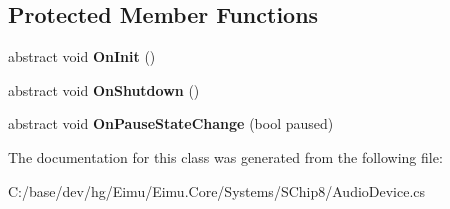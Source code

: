 \subsection*{Protected Member Functions}
\begin{DoxyCompactItemize}
\item 
\hypertarget{class_eimu_1_1_core_1_1_systems_1_1_s_chip8_1_1_audio_device_abf299f5d06f254308c7d150ea0d04c55}{
abstract void {\bfseries OnInit} ()}
\label{class_eimu_1_1_core_1_1_systems_1_1_s_chip8_1_1_audio_device_abf299f5d06f254308c7d150ea0d04c55}

\item 
\hypertarget{class_eimu_1_1_core_1_1_systems_1_1_s_chip8_1_1_audio_device_aa4aeb6770c2a1356baaf01e4164906d7}{
abstract void {\bfseries OnShutdown} ()}
\label{class_eimu_1_1_core_1_1_systems_1_1_s_chip8_1_1_audio_device_aa4aeb6770c2a1356baaf01e4164906d7}

\item 
\hypertarget{class_eimu_1_1_core_1_1_systems_1_1_s_chip8_1_1_audio_device_a299ba3feda5c88bb8033458cd6588c26}{
abstract void {\bfseries OnPauseStateChange} (bool paused)}
\label{class_eimu_1_1_core_1_1_systems_1_1_s_chip8_1_1_audio_device_a299ba3feda5c88bb8033458cd6588c26}

\end{DoxyCompactItemize}


The documentation for this class was generated from the following file:\begin{DoxyCompactItemize}
\item 
C:/base/dev/hg/Eimu/Eimu.Core/Systems/SChip8/AudioDevice.cs\end{DoxyCompactItemize}
